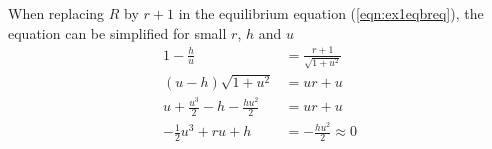 \begin{figure}[H]
\centering
{}\hspace{18pt}
\caption{}
\label{fig:graphR}
\end{figure}
When replacing $R$ by $r+1$ in the equilibrium equation (\ref{eqn:ex1eqbreq}), the equation can be simplified for small $r$, $h$ and $u$
\begin{align}
1-\frac{h}{u}&=\frac{r+1}{\sqrt{1+u^2}} \\
(u-h)\sqrt{1+u^2}&=ur+u \\
u+\frac{u^3}{2}-h-\frac{hu^2}{2}&=ur+u \\
-\frac{1}{2}u^3+ru+h&=-\frac{hu^2}{2}\approx0\label{eqn:ex1simpl}
\end{align}
